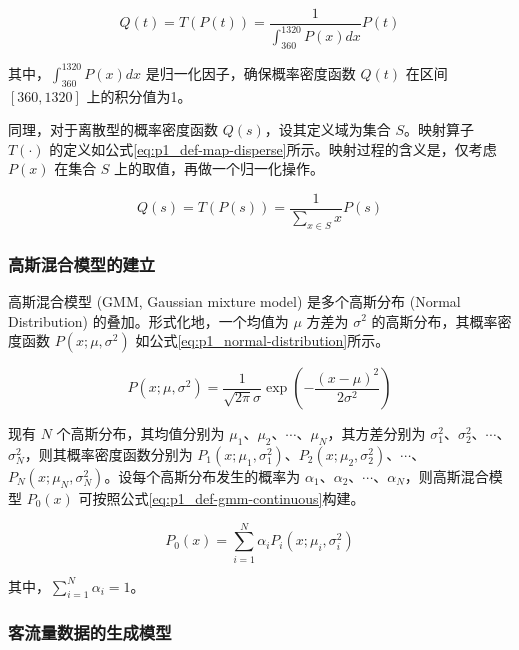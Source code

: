 \documentclass[12pt,a4paper]{mcmthesis}
\begin{document}
    \begin{equation}
        Q(t) = T(P(t)) = \frac{1}{\int_{360}^{1320}P(x)dx} P(t)
        \label{eq:p1_def-map-continuous}
    \end{equation}

    其中，$\int_{360}^{1320}P(x)dx$ 是归一化因子，确保概率密度函数 $Q(t)$ 在区间 $[360,1320]$ 上的积分值为1。

    同理，对于离散型的概率密度函数 $Q(s)$，设其定义域为集合 $S$。映射算子 $T(\cdot)$ 的定义如公式\ref{eq:p1_def-map-disperse}所示。映射过程的含义是，仅考虑$P(x)$ 在集合 $S$ 上的取值，再做一个归一化操作。

    \begin{equation}
        Q(s) = T(P(s)) = \frac{1}{\sum_{x \in S} x} P(s)
        \label{eq:p1_def-map-disperse}
    \end{equation}

    \subsubsection{高斯混合模型的建立}

    高斯混合模型 (GMM, Gaussian mixture model) 是多个高斯分布 (Normal Distribution) 的叠加。形式化地，一个均值为 $\mu$ 方差为 $\sigma^2$ 的高斯分布，其概率密度函数 $P(x;\mu,\sigma^2)$ 如公式\ref{eq:p1_normal-distribution}所示。

    \begin{equation}
        P(x;\mu,\sigma^2) = \frac{1}{\sqrt{2\pi}\sigma} \exp \left( - \frac{(x-\mu)^2}{2\sigma^2} \right)
        \label{eq:p1_normal-distribution}
    \end{equation}

    现有 $N$ 个高斯分布，其均值分别为 $\mu_1$、$\mu_2$、$\cdots$、$\mu_N$，其方差分别为 $\sigma^2_1$、$\sigma^2_2$、$\cdots$、$\sigma^2_N$，则其概率密度函数分别为 $P_1(x;\mu_1,\sigma^2_1)$、$P_2(x;\mu_2,\sigma^2_2)$、$\cdots$、$P_N(x;\mu_N,\sigma^2_N)$。设每个高斯分布发生的概率为 $\alpha_1$、$\alpha_2$、$\cdots$、$\alpha_N$，则高斯混合模型 $P_0(x)$ 可按照公式\ref{eq:p1_def-gmm-continuous}构建。

    \begin{equation}
        P_0(x) = \sum_{i=1}^{N} \alpha_i P_i(x;\mu_i,\sigma^2_i)
        \label{eq:p1_def-gmm-continuous}
    \end{equation}

    其中，$\sum_{i=1}^{N} \alpha_i=1$。

    \subsubsection{客流量数据的生成模型}
\end{document}
